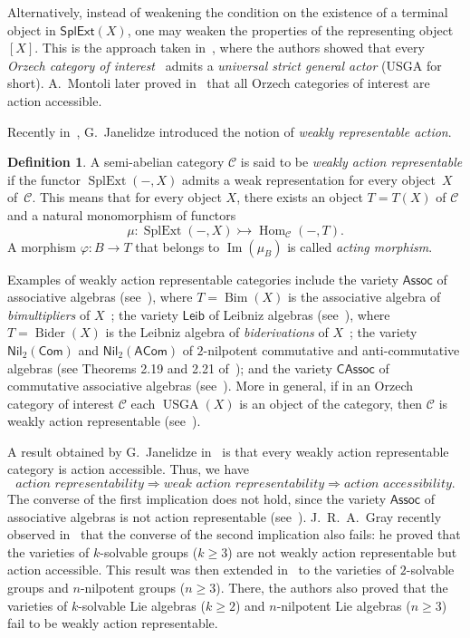 \documentclass[reqno,a4paper]{amsart}
\theoremstyle{plain}
\theoremstyle{definition}
\newtheorem{definition}[subsection]{Definition}
\theoremstyle{remark}
\numberwithin{equation}{section}
\newcommand{\C}{\ensuremath{\mathcal{C}}}
\DeclareMathOperator{\Hom}{Hom}
\DeclareMathOperator{\Bim}{Bim}
\DeclareMathOperator{\SplExt}{SplExt}
\DeclareMathOperator{\Imm}{Im}
\DeclareMathOperator{\Bider}{Bider}
\DeclareMathOperator{\USGA}{USGA}
\newcommand{\Assoc}{\ensuremath{\mathsf{Assoc}}}
\newcommand{\Leib}{\ensuremath{\mathsf{Leib}}}
\newcommand{\CAssoc}{\ensuremath{\mathsf{CAssoc}}}
\newcommand{\Com}{\ensuremath{\mathsf{Com}}}
\newcommand{\ACom}{\ensuremath{\mathsf{ACom}}}
\newcommand{\Nil}{\ensuremath{\mathsf{Nil}}}
\newcommand{\SplExtX}{\ensuremath{\mathsf{SplExt}(X)}}
\begin{document}
Alternatively, instead of weakening the condition on the existence of a terminal object in $\SplExtX$, one may weaken the properties of the representing object $[X]$. This is the approach taken in~\cite{Casas}, where the authors showed that every \emph{Orzech category of interest}~\cite{Orzech} admits a \emph{universal strict general actor} (USGA for short). A.~Montoli later proved in~\cite{Montoli} that all Orzech categories of interest are action accessible.

Recently in~\cite{WRA}, G.~Janelidze introduced the notion of \emph{weakly representable action}.

\begin{definition}\cite{WRA}
A semi-abelian category $\C$ is said to be \emph{weakly action representable} if the functor $\SplExt(-,X)$ admits a weak representation for every object~$X$ of~$\C$. This means that for every object $X$, there exists an object $T=T(X)$ of $\C$ and a natural monomorphism of functors
\[
\mu \colon \SplExt(-,X) \rightarrowtail \Hom_{\C}(-,T).
\]
A morphism $\varphi\colon B \to  T$ that belongs to $\Imm(\mu_B)$ is called \emph{acting morphism}.
\end{definition}

Examples of weakly action representable categories include the variety $\Assoc$ of associative algebras (see~\cite{WRA}), where $T=\Bim(X)$ is the associative algebra of \emph{bimultipliers} of $X$~\cite{MacLane58}; the variety $\Leib$ of Leibniz algebras (see~\cite[Theorem~3.14]{CigoliManciniMetere}), where $T=\Bider(X)$ is the Leibniz algebra of \emph{biderivations} of $X$~\cite{loday}; the variety $\Nil_2(\Com)$ and $\Nil_2(\ACom)$ of $2$-nilpotent commutative and anti-commutative algebras (see Theorems 2.19 and 2.21 of~\cite{WRAAlg}); and the variety $\CAssoc$ of commutative associative algebras (see~\cite[Theorem 2.11]{WRAAlg}). More in general, if in an Orzech category of interest $\C$ each $\USGA(X)$ is an object of the category, then $\C$ is weakly action
representable (see~\cite[Corollary 4.2]{CigoliManciniMetere}).

A result obtained by G.~Janelidze in~\cite{WRA} is that every weakly action representable category is action accessible. Thus, we have
\[
\textit{action representability}\Rightarrow\textit{weak action representability}\Rightarrow\textit{action accessibility.}
\]
The converse of the first implication does not hold, since the variety $\Assoc$ of associative algebras is not action representable (see~\cite[Proposition 1.11]{Tim}). J.~R.~A.~Gray recently observed in~\cite{Gray} that the converse of the second implication also fails: he proved that the varieties of $k$-solvable groups ($k \geq 3$) are not weakly action representable but action accessible. This result was then extended in~\cite{XabiMancini} to the varieties of $2$-solvable groups and $n$-nilpotent groups ($n \geq 3$). There, the authors also proved that the varieties of $k$-solvable Lie algebras ($k \geq 2$) and $n$-nilpotent Lie algebras ($n \geq 3$) fail to be weakly action representable.
\end{document}
